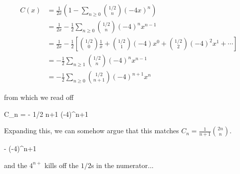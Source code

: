\begin{align*}
  C(x) &= \frac{1}{2x} \left( 1 - \sum_{n \geq 0} {1/2 \choose n} (-4x)^n \right) \\
       &= \frac{1}{2x} - \frac{1}{2} \sum_{n \geq 0} {1/2 \choose n} (-4)^n x^{n-1} \\
       &= \frac{1}{2x} - \frac{1}{2} \left[ {1/2 \choose 0} \frac{1}{x} + {1/2 \choose 1} (-4)x^0 + {1/2 \choose 2} (-4)^2 x^1 + \cdots \right] \\
       &= -\frac{1}{2} \sum_{n \geq 1} {1/2 \choose n} (-4)^n x^{n-1} \\
       &= - \frac{1}{2} \sum_{n \geq 0} {1/2 \choose n+1} (-4)^{n+1} x^{n}
\end{align*}

from which we read off

\bee
C_n = -  {1/2 \choose n+1} (-4)^{n+1}
\eee

Expanding this, we can somehow argue that this matches $C_n = \frac{1}{n+1} {2n \choose n}$. 

\bee
 -   (-4)^{n+1} 
 \eee

 and the $4^{n+}$ kills off the $1/2$s in the numerator...

